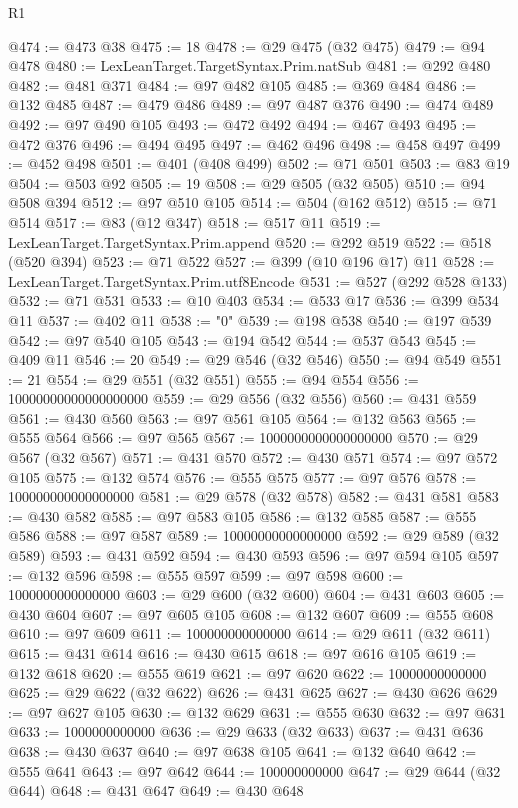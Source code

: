 \begin{lexlean}{R1}
\begin{coremodule}
{{{{{{{{{{{{{{{{{{{{{{{{{{{{{{{{{{{{{{{{{{{{{{{{{{{{{{{{{{{{{{{{{{{{{{{{{{{{{{{{{{{{{{{{{{{{{{{{{{{{{{{{{{{{{{{{{{{{{{{{{{{{{{{{{{{{{{{{{{{{{{{{{{{{{{{{{{{{{{{{{{{{{{{{{{{{{{{{{{{{{{{{{{@474 := @473 @38
@475 := 18
@478 := @29 @475 (@32 @475)
@479 := @94 @478
@480 := LexLeanTarget.TargetSyntax.Prim.natSub
@481 := @292 @480
@482 := @481 @371
@484 := @97 @482 @105
@485 := @369 @484
@486 := @132 @485
@487 := @479 @486
@489 := @97 @487 @376
@490 := @474 @489
@492 := @97 @490 @105
@493 := @472 @492
@494 := @467 @493
@495 := @472 @376
@496 := @494 @495
@497 := @462 @496
@498 := @458 @497
@499 := @452 @498
@501 := @401 (@408 @499)
@502 := @71 @501
@503 := @83 @19
@504 := @503 @92
@505 := 19
@508 := @29 @505 (@32 @505)
@510 := @94 @508 @394
@512 := @97 @510 @105
@514 := @504 (@162 @512)
@515 := @71 @514
@517 := @83 (@12 @347)
@518 := @517 @11
@519 := LexLeanTarget.TargetSyntax.Prim.append
@520 := @292 @519
@522 := @518 (@520 @394)
@523 := @71 @522
@527 := @399 (@10 @196 @17) @11
@528 := LexLeanTarget.TargetSyntax.Prim.utf8Encode
@531 := @527 (@292 @528 @133)
@532 := @71 @531
@533 := @10 @403
@534 := @533 @17
@536 := @399 @534 @11
@537 := @402 @11
@538 := "0"
@539 := @198 @538
@540 := @197 @539
@542 := @97 @540 @105
@543 := @194 @542
@544 := @537 @543
@545 := @409 @11
@546 := 20
@549 := @29 @546 (@32 @546)
@550 := @94 @549
@551 := 21
@554 := @29 @551 (@32 @551)
@555 := @94 @554
@556 := 10000000000000000000
@559 := @29 @556 (@32 @556)
@560 := @431 @559
@561 := @430 @560
@563 := @97 @561 @105
@564 := @132 @563
@565 := @555 @564
@566 := @97 @565
@567 := 1000000000000000000
@570 := @29 @567 (@32 @567)
@571 := @431 @570
@572 := @430 @571
@574 := @97 @572 @105
@575 := @132 @574
@576 := @555 @575
@577 := @97 @576
@578 := 100000000000000000
@581 := @29 @578 (@32 @578)
@582 := @431 @581
@583 := @430 @582
@585 := @97 @583 @105
@586 := @132 @585
@587 := @555 @586
@588 := @97 @587
@589 := 10000000000000000
@592 := @29 @589 (@32 @589)
@593 := @431 @592
@594 := @430 @593
@596 := @97 @594 @105
@597 := @132 @596
@598 := @555 @597
@599 := @97 @598
@600 := 1000000000000000
@603 := @29 @600 (@32 @600)
@604 := @431 @603
@605 := @430 @604
@607 := @97 @605 @105
@608 := @132 @607
@609 := @555 @608
@610 := @97 @609
@611 := 100000000000000
@614 := @29 @611 (@32 @611)
@615 := @431 @614
@616 := @430 @615
@618 := @97 @616 @105
@619 := @132 @618
@620 := @555 @619
@621 := @97 @620
@622 := 10000000000000
@625 := @29 @622 (@32 @622)
@626 := @431 @625
@627 := @430 @626
@629 := @97 @627 @105
@630 := @132 @629
@631 := @555 @630
@632 := @97 @631
@633 := 1000000000000
@636 := @29 @633 (@32 @633)
@637 := @431 @636
@638 := @430 @637
@640 := @97 @638 @105
@641 := @132 @640
@642 := @555 @641
@643 := @97 @642
@644 := 100000000000
@647 := @29 @644 (@32 @644)
@648 := @431 @647
@649 := @430 @648
}}}}}}}}}}}}}}}}}}}}}}}}}}}}}}}}}}}}}}}}}}}}}}}}}}}}}}}}}}}}}}}}}}}}}}}}}}}}}}}}}}}}}}}}}}}}}}}}}}}}}}}}}}}}}}}}}}}}}}}}}}}}}}}}}}}}}}}}}}}}}}}}}}}}}}}}}}}}}}}}}}}}}}}}}}}}}}}}}}}}}}}}}}
\end{coremodule}
\end{lexlean}
